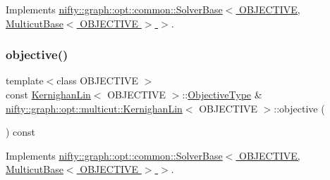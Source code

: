 Implements \hyperlink{classnifty_1_1graph_1_1opt_1_1common_1_1SolverBase_af638b9a804cfec3e35fe87c77e942d30}{nifty\+::graph\+::opt\+::common\+::\+Solver\+Base$<$ O\+B\+J\+E\+C\+T\+I\+V\+E, Multicut\+Base$<$ O\+B\+J\+E\+C\+T\+I\+V\+E $>$ $>$}.

\mbox{\label{classnifty_1_1graph_1_1opt_1_1multicut_1_1KernighanLin_a66a62895fd9b83f0ca17e45bd6a6eb29}} 
\subsubsection{\texorpdfstring{objective()}{objective()}}
{\footnotesize\ttfamily template$<$class O\+B\+J\+E\+C\+T\+I\+VE $>$ \\
const \hyperlink{classnifty_1_1graph_1_1opt_1_1multicut_1_1KernighanLin}{Kernighan\+Lin}$<$ O\+B\+J\+E\+C\+T\+I\+VE $>$\+::\hyperlink{classnifty_1_1graph_1_1opt_1_1multicut_1_1KernighanLin_aa5a1c5a577ff9d17db32d5871da3ed45}{Objective\+Type} \& \hyperlink{classnifty_1_1graph_1_1opt_1_1multicut_1_1KernighanLin}{nifty\+::graph\+::opt\+::multicut\+::\+Kernighan\+Lin}$<$ O\+B\+J\+E\+C\+T\+I\+VE $>$\+::objective (\begin{DoxyParamCaption}{ }\end{DoxyParamCaption}) const\hspace{0.3cm}{\ttfamily [virtual]}}



Implements \hyperlink{classnifty_1_1graph_1_1opt_1_1common_1_1SolverBase_a55e9eb645c07d6e0782ebfb990ab3c84}{nifty\+::graph\+::opt\+::common\+::\+Solver\+Base$<$ O\+B\+J\+E\+C\+T\+I\+V\+E, Multicut\+Base$<$ O\+B\+J\+E\+C\+T\+I\+V\+E $>$ $>$}.

\mbox{\label{classnifty_1_1graph_1_1opt_1_1multicut_1_1KernighanLin_a5ec3fa23df487a593127fb29dbccfc24}} 
